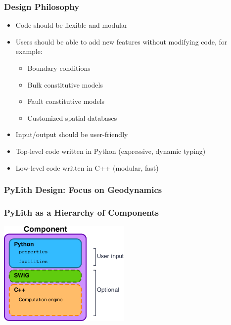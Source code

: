 \documentclass{beamer}
\begin{document}
\begin{frame}
  \frametitle{Design Philosophy}

  \begin{itemize}
  \item Code should be flexible and modular
  \item Users should be able to add new features without modifying
    code, for example:
    \begin{itemize}
    \item Boundary conditions
    \item Bulk constitutive models
    \item Fault constitutive models
    \item Customized spatial databases
    \end{itemize}
  \item Input/output should be user-friendly
  \item Top-level code written in Python (expressive, dynamic typing)
  \item Low-level code written in C++ (modular, fast)
\end{itemize}

\end{frame}


\begin{frame}
  \frametitle{PyLith Design: Focus on Geodynamics}

  

\end{frame}


\begin{frame}
  \frametitle{PyLith as a Hierarchy of Components}

  \vfill
  \begin{center}
    \includegraphics[height=2.0in]{figs/component}
  \end{center}  
  \vfill

\end{frame}
\end{document}
